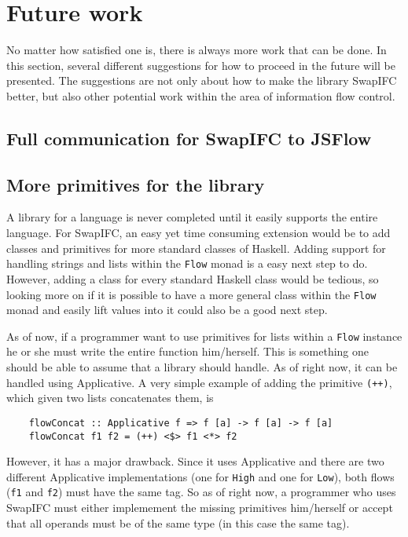 \chapter{Future work}
\label{chapter:future}
No matter how satisfied one is, there is always more work that can be done. In this section, several different suggestions for how to proceed in the future will be presented. The suggestions are not only about how to make the library SwapIFC better, but also other potential work within the area of information flow control.

\section{Full communication for SwapIFC to JSFlow}

\section{More primitives for the library}
A library for a language is never completed until it easily supports the entire language. For SwapIFC, an easy yet time consuming extension would be to add classes and primitives for more standard classes of Haskell. Adding support for handling strings and lists within the {\tt Flow} monad is a easy next step to do. However, adding a class for every standard Haskell class would be tedious, so looking more on if it is possible to have a more general class within the {\tt Flow} monad and easily lift values into it could also be a good next step.

As of now, if a programmer want to use primitives for lists within a {\tt Flow} instance he or she must write the entire function him/herself. This is something one should be able to assume that a library should handle. As of right now, it can be handled using Applicative. A very simple example of adding the primitive {\tt (++)}, which given two lists concatenates them, is
\begin{verbatim}
    flowConcat :: Applicative f => f [a] -> f [a] -> f [a]
    flowConcat f1 f2 = (++) <$> f1 <*> f2
\end{verbatim}
However, it has a major drawback. Since it uses Applicative and there are two different Applicative implementations (one for {\tt High} and one for {\tt Low}), both flows ({\tt f1} and {\tt f2}) must have the same tag. So as of right now, a programmer who uses SwapIFC must either implemement the missing primitives him/herself or accept that all operands must be of the same type (in this case the same tag).

